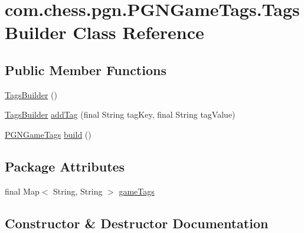 \hypertarget{classcom_1_1chess_1_1pgn_1_1_p_g_n_game_tags_1_1_tags_builder}{}\section{com.\+chess.\+pgn.\+P\+G\+N\+Game\+Tags.\+Tags\+Builder Class Reference}
\label{classcom_1_1chess_1_1pgn_1_1_p_g_n_game_tags_1_1_tags_builder}
\subsection*{Public Member Functions}
\begin{DoxyCompactItemize}
\item 
\mbox{\hyperlink{classcom_1_1chess_1_1pgn_1_1_p_g_n_game_tags_1_1_tags_builder_a2e37fb132635d3fd45f4b379d615968e}{Tags\+Builder}} ()
\item 
\mbox{\hyperlink{classcom_1_1chess_1_1pgn_1_1_p_g_n_game_tags_1_1_tags_builder}{Tags\+Builder}} \mbox{\hyperlink{classcom_1_1chess_1_1pgn_1_1_p_g_n_game_tags_1_1_tags_builder_ad5ec9af32b02288d29839ebcb06fb0d6}{add\+Tag}} (final String tag\+Key, final String tag\+Value)
\item 
\mbox{\hyperlink{classcom_1_1chess_1_1pgn_1_1_p_g_n_game_tags}{P\+G\+N\+Game\+Tags}} \mbox{\hyperlink{classcom_1_1chess_1_1pgn_1_1_p_g_n_game_tags_1_1_tags_builder_a5c58299a437c70c4a05ea3dda1abc2a5}{build}} ()
\end{DoxyCompactItemize}
\subsection*{Package Attributes}
\begin{DoxyCompactItemize}
\item 
final Map$<$ String, String $>$ \mbox{\hyperlink{classcom_1_1chess_1_1pgn_1_1_p_g_n_game_tags_1_1_tags_builder_a03b4355896f59dcb7043ebd00bb66126}{game\+Tags}}
\end{DoxyCompactItemize}


\subsection{Constructor \& Destructor Documentation}
\mbox{\label{classcom_1_1chess_1_1pgn_1_1_p_g_n_game_tags_1_1_tags_builder_a2e37fb132635d3fd45f4b379d615968e}} 
